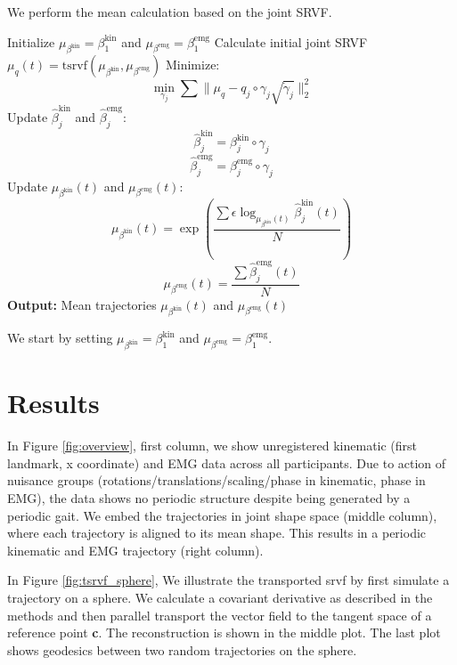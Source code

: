 \documentclass{article}
\begin{document}
We perform the mean calculation based on the joint SRVF.

\begin{algorithm}
\caption{Mean Calculation}
\begin{algorithmic}[1]
\STATE Initialize $\mu_{\beta^{\text{kin}}} = \beta_1^{\text{kin}}$ and $\mu_{\beta^{\text{emg}}} = \beta_1^{\text{emg}}$
\STATE Calculate initial joint SRVF $\mu_q(t) = \text{tsrvf}(\mu_{\beta^{\text{kin}}}, \mu_{\beta^{\text{emg}}})$
\REPEAT
        \STATE Minimize:
        \[
        \min_{\gamma_j} \sum \lVert \mu_q - q_j \circ \gamma_j \sqrt{\dot{\gamma}_j} \rVert_2^2
        \]
        \STATE Update $\hat{\beta}_j^{\text{kin}}$ and $\hat{\beta}_j^{\text{emg}}$:
        \[
        \hat{\beta}_j^{\text{kin}} = \beta_j^{\text{kin}} \circ \gamma_j
        \]
        \[
        \hat{\beta}_j^{\text{emg}} = \beta_j^{\text{emg}} \circ \gamma_j
        \]
    \ENDFOR
    \STATE Update $\mu_{\beta^{\text{kin}}}(t)$ and $\mu_{\beta^{\text{emg}}}(t)$:
    \[
    \mu_{\beta^{\text{kin}}}(t) = \exp \left( \frac{\sum \epsilon \log_{\mu_{\beta^{\text{kin}}}(t)} \hat{\beta}_j^{\text{kin}}(t)}{N} \right)
    \]
    \[
    \mu_{\beta^{\text{emg}}}(t) = \frac{\sum \hat{\beta}_j^{\text{emg}}(t)}{N}
    \]
\STATE \textbf{Output:} Mean trajectories $\mu_{\beta^{\text{kin}}}(t)$ and $\mu_{\beta^{\text{emg}}}(t)$
\end{algorithmic}
\end{algorithm}

We start by setting $\mu_{\beta^{\text{kin}}} = \beta_1^{\text{kin}}$ and $\mu_{\beta^{\text{emg}}} = \beta_1^{\text{emg}}$.

\section{Results}


In Figure \ref{fig:overview}, first column, we show unregistered kinematic (first landmark, x coordinate) and EMG data across all participants. Due to action of nuisance groups (rotations/translations/scaling/phase in kinematic, phase in EMG), the data shows no periodic structure despite being generated by a periodic gait. We embed the trajectories in joint shape space (middle column), where each trajectory is aligned to its mean shape. This results in a periodic kinematic and EMG trajectory (right column).

In Figure \ref{fig:tsrvf_sphere}, We illustrate the transported srvf by first simulate a trajectory on a sphere. We calculate a covariant derivative as described in the methods and then parallel transport the vector field to the tangent space of a reference point \textbf{c}. The reconstruction is shown in the middle plot. The last plot shows geodesics between two random trajectories on the sphere.
\end{document}
